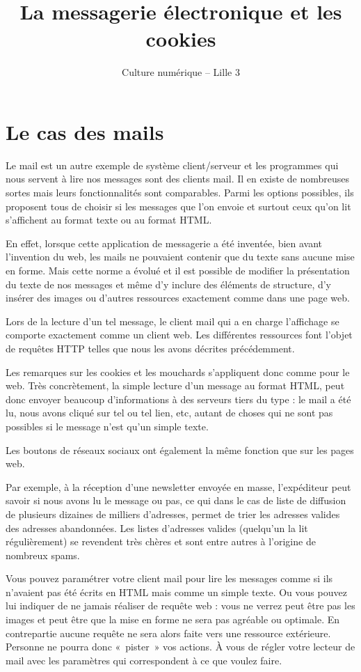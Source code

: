 \documentclass[12pt]{article}
\title{La messagerie électronique et les cookies}
\author {Culture numérique -- Lille 3}
\date{}
\begin{document}
\maketitle
\section*{Le cas des mails}

Le mail est un autre exemple de système client/serveur et les
programmes qui nous servent à lire nos messages sont des clients
mail. Il en existe de nombreuses sortes mais leurs fonctionnalités
sont comparables. Parmi les options possibles, ils proposent tous de
choisir si les messages que l'on envoie et surtout ceux qu'on lit
s'affichent au format texte ou au format HTML.

En effet, lorsque cette application de messagerie a été inventée, bien
avant l'invention du web,  les mails ne pouvaient contenir que du
texte sans aucune mise en forme. Mais cette norme a évolué et il est
possible de modifier la présentation du texte de nos messages et même
d'y inclure des éléments de structure, d'y insérer des images ou
d'autres ressources exactement comme dans une page web.

Lors de la lecture d'un tel message, le client mail qui a en charge
l'affichage se comporte exactement comme un client web. Les
différentes ressources font l'objet de requêtes HTTP telles que nous
les avons décrites précédemment.

Les remarques sur les cookies et les mouchards s'appliquent donc comme
pour le web. Très concrètement, la simple lecture d'un message au
format HTML, peut donc envoyer beaucoup d'informations à des serveurs
tiers du type : le mail a été lu, nous avons cliqué sur tel ou tel
lien, etc, autant de choses qui ne sont pas possibles si le message
n'est qu'un simple texte.

Les boutons de réseaux sociaux ont également la même fonction que sur
les pages web.

Par exemple, à la réception d'une newsletter envoyée en masse,
l'expéditeur peut savoir si nous avons lu le message ou pas, ce qui
dans le cas de liste de diffusion de plusieurs dizaines de milliers
d'adresses, permet de trier les adresses valides des adresses
abandonnées. Les listes d'adresses valides (quelqu'un la lit
régulièrement) se revendent très chères et sont entre autres à
l'origine de nombreux spams.

Vous pouvez paramétrer votre client mail pour lire les messages comme
si ils n'avaient pas été écrits en HTML mais comme un simple texte. Ou
vous pouvez lui indiquer de ne jamais réaliser de requête web : vous
ne verrez peut être pas les images et peut être que la mise en forme
ne sera pas agréable ou optimale. En contrepartie aucune requête ne
sera alors faite vers une ressource extérieure. Personne ne pourra
donc «~pister~» vos actions. À vous de régler votre lecteur de mail
avec les paramètres qui correspondent à ce que voulez faire.
\end{document}
